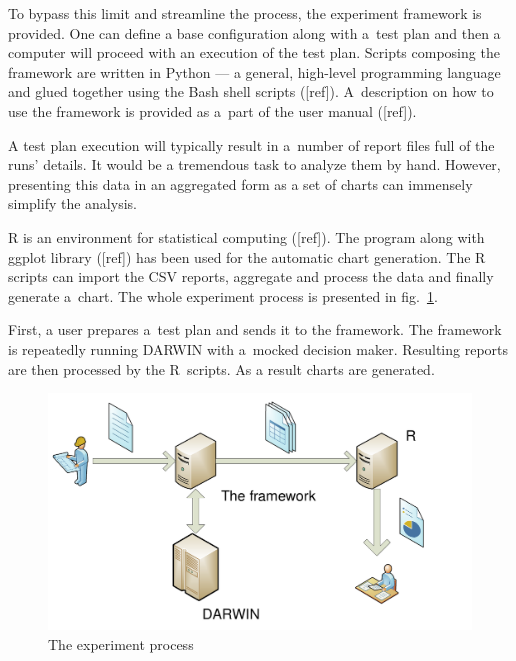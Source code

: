 To bypass this limit and streamline the process, the experiment framework is
provided. One can define a base configuration along with a~test plan and then
a computer will proceed with an execution of the test plan. Scripts composing
the framework are written in Python --- a general, high-level programming
language and glued together using the Bash shell scripts
([ref]). A~description on how to use the framework is provided as a~part of
the user manual ([ref]).

A test plan execution will typically result in a~number of report files full
of the runs' details. It would be a tremendous task to analyze them by
hand. However, presenting this data in an aggregated form as a set of charts
can immensely simplify the analysis.

R is an environment for statistical computing ([ref]). The program along with
ggplot library ([ref]) has been used for the automatic chart generation. The R
scripts can import the CSV reports, aggregate and process the data and finally
generate a~chart. The whole experiment process is presented in
fig.~\ref{framework}.

First, a user prepares a~test plan and sends it to the framework. The
framework is repeatedly running DARWIN with a~mocked decision maker. Resulting
reports are then processed by the R~scripts. As a result charts are generated.

\begin{figure}
  \centering \includegraphics[width=\textwidth]{img/framework}
  \caption{The experiment process}
  \label{framework}
\end{figure}

